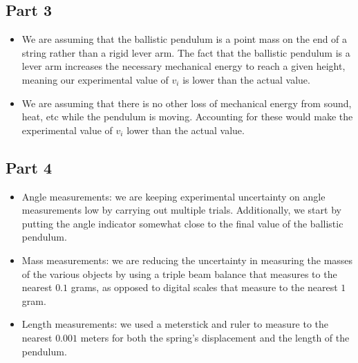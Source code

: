 \documentclass[8pt]{extarticle}
\begin{document}
{\subsection*{Part 3}
\begin{itemize}
	\item We are assuming that the ballistic pendulum is a point mass on the end of a string rather than a rigid lever arm. The fact that the ballistic pendulum is a lever arm increases the necessary mechanical energy to reach a given height, meaning our experimental value of $v_i$ is lower than the actual value.
	\item We are assuming that there is no other loss of mechanical energy from sound, heat, etc while the pendulum is moving. Accounting for these would make the experimental value of $v_i$ lower than the actual value.
\end{itemize}
\subsection*{Part 4}
\begin{itemize}
	\item Angle measurements: we are keeping experimental uncertainty on angle measurements low by carrying out multiple trials. Additionally, we start by putting the angle indicator somewhat close to the final value of the ballistic pendulum.
	\item Mass measurements: we are reducing the uncertainty in measuring the masses of the various objects by using a triple beam balance that measures to the nearest $0.1$ grams, as opposed to digital scales that measure to the nearest $1$ gram.
	\item Length measurements: we used a meterstick and ruler to measure to the nearest $0.001$ meters for both the spring's displacement and the length of the pendulum.
\end{itemize}
}
\end{document}
